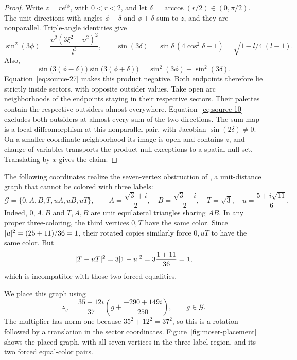 \begin{proof}
Write \(z=r e^{i\phi}\), with \(0<r<2\), and let
\(\delta=\arccos(r/2)\in(0,\pi/2)\).  The unit directions
with angles \(\phi-\delta\) and \(\phi+\delta\) sum to
\(z\), and they are nonparallel.  Triple-angle identities give
\[
 \sin^2(3\phi)=\frac{\upsilon^2(3\xi^2-\upsilon^2)^2}{l^3},
 \qquad
 \sin(3\delta)=\sin\delta\,(4\cos^2\delta-1)
             =\sqrt{1-l/4}\,(l-1).
\]
Also,
\[
 \sin\bigl(3(\phi-\delta)\bigr)
 \sin\bigl(3(\phi+\delta)\bigr)
 =\sin^2(3\phi)-\sin^2(3\delta).
\]
Equation~\eqref{eq:source-27} makes this product negative.
Both endpoints therefore lie strictly inside sectors, with
opposite outsider values.  Take open arc neighborhoods of
the endpoints staying in their respective sectors.  Their
palettes contain the respective outsiders almost everywhere.
Equation~\eqref{eq:source-10} excludes both outsiders at
almost every sum of the two directions.  The sum map is
a local diffeomorphism at this nonparallel pair, with
Jacobian \(\sin(2\delta)\ne0\).  On a smaller coordinate
neighborhood its image is open and contains \(z\), and
change of variables transports the product-null exceptions
to a spatial null set.  Translating by \(x\) gives the claim.
\end{proof}

The following coordinates realize the seven-vertex obstruction
of \citet{MoserMoser1961}, a unit-distance graph that cannot
be colored with three labels:
\begin{equation}\label{eq:angular-seven-vectors}
 \mathcal G=\{0,A,B,T,uA,uB,uT\},\qquad
 A=\frac{\sqrt3+i}{2},\quad B=\frac{\sqrt3-i}{2},\quad
 T=\sqrt3,\quad u=\frac{5+i\sqrt{11}}6.
\end{equation}
Indeed, \(0,A,B\) and \(T,A,B\) are unit equilateral
triangles sharing \(AB\).  In any proper three-coloring,
the third vertices \(0,T\) have the same color.  Since
\(\lvert u\rvert^2=(25+11)/36=1\), their rotated copies similarly
force \(0,uT\) to have the same color.  But
\[
 \lvert T-uT\rvert^2=3\lvert1-u\rvert^2
              =3\frac{1+11}{36}=1,
\]
which is incompatible with those two forced equalities.

We place this graph using
\begin{equation}\label{eq:angular-placement}
 z_g=\frac{35+12i}{37}
       \left(g+\frac{-290+149i}{250}\right),
 \qquad g\in\mathcal G.
\end{equation}
The multiplier has norm one because \(35^2+12^2=37^2\),
so this is a rotation followed by a translation in the
sector coordinates. Figure~\ref{fig:moser-placement} shows the placed
graph, with all seven vertices in the three-label region, and its two
forced equal-color pairs.


